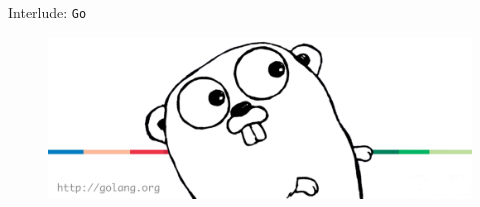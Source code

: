 \documentclass[9pt]{beamer}
\begin{document}
\begin{frame}[fragile]

	\begin{columns}
		\begin{column}{0.49\textwidth}
			\begin{block}{}
				\begin{center}
				Interlude: \texttt{Go}
				\end{center}
			\end{block}

\begin{figure}[h]
\begin{center}
\includegraphics[width=\textwidth]{_figs/golang-logo.png}
\end{center}

\end{figure}

		\end{column}
	\end{columns}


\end{frame}
\end{document}
